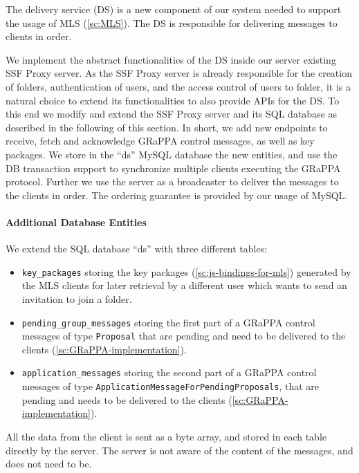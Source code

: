 The delivery service (DS) is a new component of our system needed 
to support the usage of MLS (\cref{sc:MLS}).
The DS is responsible for delivering messages to clients in order.

We implement the abstract functionalities of the DS inside our server existing SSF Proxy
server. As the SSF Proxy server is already responsible for the creation of folders,
authentication of users, and the access control of users to folder, 
it is a natural choice to extend its functionalities to also provide APIs
for the DS.
To this end we modify and extend the SSF Proxy server and its SQL database as described
in the following of this section.
In short, we add new endpoints to receive, fetch and acknowledge
GRaPPA control messages, as well as key packages.
We store in the ``ds'' MySQL database the new entities, and use the
DB transaction support to synchronize multiple clients executing
the GRaPPA protocol. Further we use the server as a broadcaster to
deliver the messages to the clients in order. The ordering guarantee
is provided by our usage of MySQL.

\paragraph{Additional Database Entities}
We extend the SQL database ``ds'' with three different tables:
\begin{itemize}
    \item \texttt{key\_packages} storing the key packages (\cref{sc:js-bindings-for-mls}) generated by the MLS clients for later retrieval by a different user which wants to send an invitation to join a folder.
    \item \texttt{pending\_group\_messages} storing the first part of a GRaPPA control messages of type \texttt{Proposal} that are pending and need to be delivered to the clients (\cref{sc:GRaPPA-implementation}).
    \item \texttt{application\_messages} storing the second part of a GRaPPA control messages of type \texttt{ApplicationMessageForPendingProposals}, that are pending and needs to be delivered to the clients (\cref{sc:GRaPPA-implementation}).
\end{itemize}

All the data from the client is sent as a byte array, and stored in each table
directly by the server. The server is not aware of the content of the messages,
and does not need to be.

